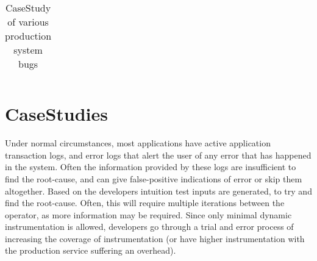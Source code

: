 \begin{table*}[!ht]
\begin{tabular}{|c|c|c|c|c|c|c|c|}
\end{tabular}
\caption{CaseStudy of various production system bugs}
\label{table:casestudy}
\end{table*}


\section{CaseStudies}
\label{sec:casestudy}



Under normal circumstances, most applications have active application transaction logs, and error logs that alert the user of any error that has happened in the system.
Often the information provided by these logs are insufficient to find the root-cause, and can give false-positive indications of error or  skip them altogether.
Based on the developers intuition test inputs are generated, to try and find the root-cause. 
Often, this will require multiple iterations between the operator, as more information may be required. 
Since only minimal dynamic instrumentation is allowed, developers go through a trial and error process of increasing the coverage of instrumentation 
(or have higher instrumentation with the production service suffering an overhead).

